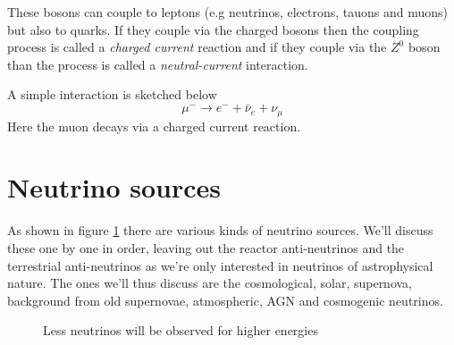 These bosons can couple to leptons (e.g neutrinos, electrons, tauons and muons)
but also to quarks. If they couple via the charged bosons then the coupling process
is called a \textit{charged current} reaction and if they couple via the $Z^0$ boson
than the process is called a \textit{neutral-current} interaction.

A simple interaction is sketched below
\begin{equation}
  \mu^- \rightarrow e^- + \bar{\nu}_e + \nu_\mu
\end{equation}
Here the muon decays via a charged current reaction.
\section{Neutrino sources}
As shown in figure \ref{figure:Neutrino fluxes}\cite{NeutrinoFlux} there are various kinds of
neutrino sources. We'll discuss these one by one in order, leaving out the
reactor anti-neutrinos and the terrestrial anti-neutrinos as we're only
interested in neutrinos of astrophysical nature. The ones we'll
thus discuss are the cosmological, solar, supernova, background from old supernovae, atmospheric, AGN and cosmogenic neutrinos.
\begin{figure}
	\centering
	\caption{Less neutrinos will be observed for higher energies}
	\label{figure:Neutrino fluxes}
\end{figure}
